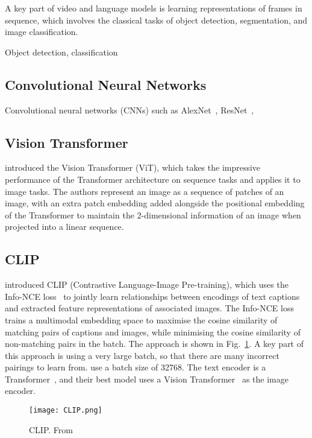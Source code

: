 A key part of video and language models is learning representations of frames
in sequence, which involves the classical tasks of object detection,
segmentation, and image classification.

Object detection, classification

\subsection{Convolutional Neural Networks}
\label{ssec:cnn}

Convolutional neural networks (CNNs) such as
AlexNet~\citep{krizhevsky2012alexnet}, ResNet~\citep{he2016resnet},

\subsection{Vision Transformer}
\label{ssec:vit}

\cite{dosovitskiy2021vit} introduced the Vision Transformer (ViT), which takes
the impressive performance of the Transformer architecture on sequence tasks
and applies it to image tasks. The authors represent an image as a sequence of
patches of an image, with an extra patch embedding added alongside the
positional embedding of the Transformer \cite{vaswani2017attention} to maintain
the 2-dimensional information of an image when projected into a linear
sequence. 

\subsection{CLIP}
\label{ssec:clip}

\cite{radford2021clip} introduced CLIP (Contrastive Language-Image
Pre-training), which uses the Info-NCE loss~\citep{oord2019infonce} to jointly
learn relationships between encodings of text captions and extracted feature
representations of associated images. The Info-NCE loss trains a multimodal
embedding space to maximise the cosine similarity of matching pairs of captions
and images, while minimising the cosine similarity of non-matching pairs in the
batch. The approach is shown in Fig.~\ref{fig:clip}. A key part of this
approach is using a very large batch, so that there are many incorrect pairings
to learn from. \cite{radford2021clip} use a batch size of 32768. The text
encoder is a Transformer~\citep{vaswani2017attention}, and their best model
uses a Vision Transformer~\citep{dosovitskiy2021vit} as the image encoder.

\begin{figure}[htpb]
	\centering
	\texttt{[image: CLIP.png]}
	\caption{CLIP. From~\cite{radford2021clip}}
	\label{fig:clip}
\end{figure}


